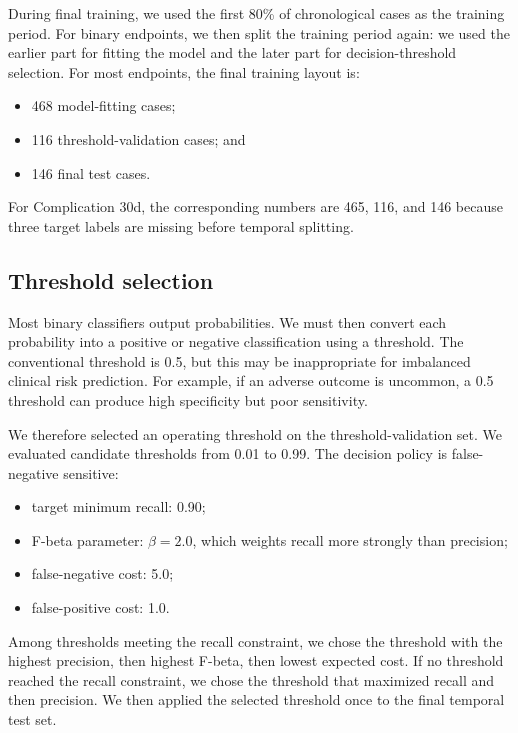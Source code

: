 \documentclass[11pt,a4paper]{article}
\begin{document}
During final training, we used the first 80\% of chronological cases as the training period. For binary endpoints, we then split the training period again: we used the earlier part for fitting the model and the later part for decision-threshold selection. For most endpoints, the final training layout is:

\begin{itemize}
    \item 468 model-fitting cases;
    \item 116 threshold-validation cases; and
    \item 146 final test cases.
\end{itemize}

For Complication 30d, the corresponding numbers are 465, 116, and 146 because three target labels are missing before temporal splitting.

\subsection{Threshold selection}

Most binary classifiers output probabilities. We must then convert each probability into a positive or negative classification using a threshold. The conventional threshold is 0.5, but this may be inappropriate for imbalanced clinical risk prediction. For example, if an adverse outcome is uncommon, a 0.5 threshold can produce high specificity but poor sensitivity.

We therefore selected an operating threshold on the threshold-validation set. We evaluated candidate thresholds from 0.01 to 0.99. The decision policy is false-negative sensitive:

\begin{itemize}
    \item target minimum recall: 0.90;
    \item F-beta parameter: $\beta=2.0$, which weights recall more strongly than precision;
    \item false-negative cost: 5.0;
    \item false-positive cost: 1.0.
\end{itemize}

Among thresholds meeting the recall constraint, we chose the threshold with the highest precision, then highest F-beta, then lowest expected cost. If no threshold reached the recall constraint, we chose the threshold that maximized recall and then precision. We then applied the selected threshold once to the final temporal test set.
\end{document}
